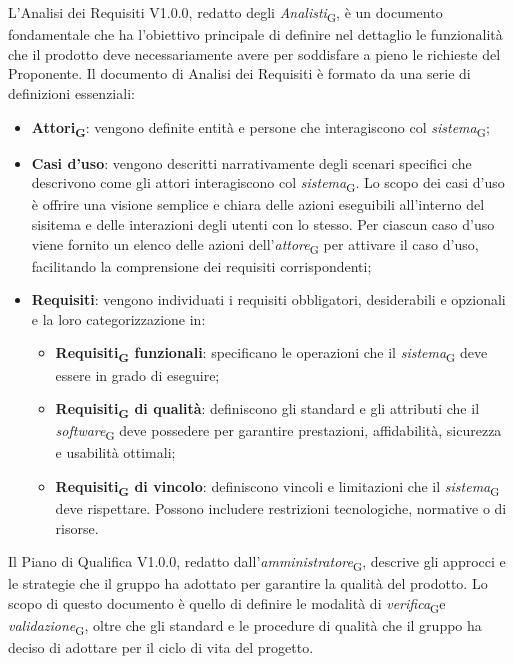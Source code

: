 L'Analisi dei Requisiti V1.0.0, redatto degli \textit{Analisti}\textsubscript{G}, è un documento fondamentale che ha l'obiettivo principale di definire nel dettaglio le funzionalità che il prodotto deve necessariamente avere per soddisfare a pieno le richieste del Proponente. 
Il documento di Analisi dei Requisiti è formato da una serie di definizioni essenziali:
\begin{itemize}
    \item \textbf{Attori\textsubscript{G}}: vengono definite entità e persone che interagiscono col \textit{sistema}\textsubscript{G};
    \item \textbf{Casi d'uso}: vengono descritti narrativamente degli scenari specifici che descrivono come gli attori interagiscono col \textit{sistema}\textsubscript{G}. Lo scopo dei casi d'uso è offrire una visione semplice e chiara delle azioni eseguibili all'interno del sisitema e delle interazioni degli utenti con lo stesso. Per ciascun caso d'uso viene fornito un elenco delle azioni dell'\textit{attore}\textsubscript{G} per attivare il caso d'uso, facilitando la comprensione dei requisiti corrispondenti;
    \item \textbf{Requisiti}: vengono individuati i requisiti obbligatori, desiderabili e opzionali e la loro categorizzazione in: 
    \begin{itemize}
        \item \textbf{Requisiti\textsubscript{G} funzionali}: specificano le operazioni che il \textit{sistema}\textsubscript{G} deve essere in grado di eseguire; 
        \item \textbf{Requisiti\textsubscript{G} di qualità}: definiscono gli standard e gli attributi che il \textit{software}\textsubscript{G} deve possedere per garantire prestazioni, affidabilità, sicurezza e usabilità ottimali;
        \item \textbf{Requisiti\textsubscript{G} di vincolo}: definiscono vincoli e limitazioni che il \textit{sistema}\textsubscript{G} deve rispettare. Possono includere restrizioni tecnologiche, normative o di risorse.
    \end{itemize}
\end{itemize}
Il Piano di Qualifica V1.0.0, redatto dall'\textit{amministratore}\textsubscript{G}, descrive gli approcci e le strategie che il gruppo ha adottato per garantire la qualità del prodotto. Lo scopo di questo documento è quello di definire le modalità di \textit{verifica}\textsubscript{G}e \textit{validazione}\textsubscript{G}, oltre che gli standard e le procedure di qualità che il gruppo ha deciso di adottare per il ciclo di vita del progetto. \\ 
